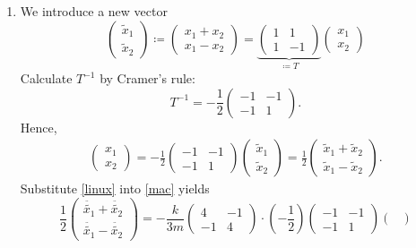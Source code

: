\documentclass{article}
\theoremstyle{named}
\begin{document}
\begin{enumerate}[label=(\roman*)]
	\item We introduce a new vector $$\begin{pmatrix}
	\tilde x_1 \\ \tilde x_2
	\end{pmatrix} \coloneqq \begin{pmatrix}
		x_1+x_2 \\ x_1 - x_2
	\end{pmatrix} = \underbrace{\begin{pmatrix}
		1 & 1 \\ 1 & -1
	\end{pmatrix}}_{\coloneqq T} \begin{pmatrix}
	x_1 \\ x_2
	\end{pmatrix}$$
	Calculate $T^{-1}$ by Cramer's rule:
	\[
		T^{-1} = -\frac{1}{2} \begin{pmatrix}
		-1 & -1 \\ -1 & 1
		\end{pmatrix}.
	\]
	Hence,
	\begin{align}\label{mac}
		\begin{pmatrix}
		x_1 \\ x_2
		\end{pmatrix} = -\frac{1}{2} \begin{pmatrix}
		-1 & -1 \\ -1 & 1
		\end{pmatrix} \begin{pmatrix}
			\tilde x_1 \\ \tilde x_2
		\end{pmatrix} = \frac{1}{2}\begin{pmatrix}
			\tilde x_1 + \tilde x_2 \\ \tilde x_1 - \tilde x_2
		\end{pmatrix}.
	\end{align}
	Substitute \eqref{linux} into \eqref{mac} yields
	\[
		\frac{1}{2} \begin{pmatrix}
			\ddot{\tilde{x_1}} + \ddot{\tilde{x_2}} \\ \ddot{\tilde{x_1}} -\ddot{\tilde{x_2}}
		\end{pmatrix} = -\frac{k}{3m}\begin{pmatrix}
		4 & -1 \\ -1 & 4
		\end{pmatrix} \cdot (-\frac{1}{2}) \begin{pmatrix}
		-1 & -1 \\ -1 & 1
		\end{pmatrix} \begin{pmatrix}

\end{pmatrix}\]
\end{enumerate}
\end{document}
